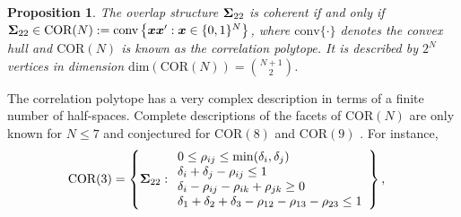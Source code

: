 \documentclass[12pt]{article}
\newcommand{\COR}{\text{COR}}
\newtheorem{proposition}[theorem]{Proposition}
\theoremstyle{definition}
\theoremstyle{definition}
\def\conv{\text{conv}}
\begin{document}
\begin{proposition}
\label{CorrelationPolytope}
The overlap structure ${\bf\Sigma}_{22}$ is coherent if and only
if 
${\bf\Sigma}_{22} \in \COR(N) := \conv\left\{
\boldsymbol{x}\boldsymbol{x}' : \boldsymbol{x} \in
\{0,1\}^N\right\}$,
where $\conv\{\cdot\}$ denotes the convex hull and $\COR(N)$ is known as the correlation
polytope. It is described by $2^N$
vertices in dimension $\text{dim}(\COR(N)) = \binom{N+1}{2}$.
\end{proposition}
The correlation polytope has a very complex description in terms of a finite
number of half-spaces. Complete descriptions of the facets of $\COR(N)$ are only known for $N \leq 7$ and conjectured for  $\COR(8)$ and $\COR(9)$ 
\citep{ziegler2000lectures}. For instance, 
\begin{align*}
\COR(3) &= 
\left\{ {\bf\Sigma}_{22} : 
\begin{array}{ll}
 0 \leq \rho_{ij} \leq \min(\delta_i, \delta_j)\\
 \delta_i + \delta_j - \rho_{ij} \leq 1\\
 \delta_i - \rho_{ij} - \rho_{ik} + \rho_{jk} \geq 0\\
 \delta_1 + \delta_2 + \delta_3 - \rho_{12} - \rho_{13} - \rho_{23} \leq 1
\end{array}
\right\},
\end{align*}
\end{document}
